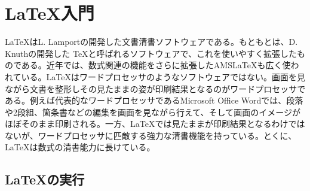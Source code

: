 \chapter{\LaTeX 入門}

\noindent
\LaTeX はL. Lamportの開発した文書清書ソフトウェアである。もともとは、D. Knuthの開発した \TeX と呼ばれるソフトウェアで、これを使いやすく拡張したものである。近年では、数式関連の機能をさらに拡張したAMS\LaTeX も広く使われている。\LaTeX はワードプロセッサのようなソフトウェアではない。画面を見ながら文書を整形しその見たままの姿が印刷結果となるのがワードプロセッサである。例えば代表的なワードプロセッサであるMicrosoft Office Wordでは、段落や2段組、箇条書などの編集を画面を見ながら行えて、そして画面のイメージがほぼそのまま印刷される。一方、\LaTeX では見たままが印刷結果となるわけではないが、ワードプロセッサに匹敵する強力な清書機能を持っている。とくに、\LaTeX は数式の清書能力に長けている。

\section{\LaTeX の実行}
\label{sec:latex:intro}

